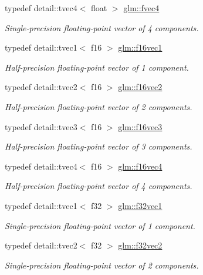 \begin{DoxyCompactItemize}
typedef detail\-::tvec4$<$ float $>$ \hyperlink{group__gtc__type__precision_ga5130b151317f24b13f1d0aa999f5fa36}{glm\-::fvec4}
\begin{DoxyCompactList}\small\item\em Single-\/precision floating-\/point vector of 4 components. \end{DoxyCompactList}\item 
typedef detail\-::tvec1$<$ f16 $>$ \hyperlink{group__gtc__type__precision_ga56f4754172a1f0fb186d95e865106f5a}{glm\-::f16vec1}
\begin{DoxyCompactList}\small\item\em Half-\/precision floating-\/point vector of 1 component. \end{DoxyCompactList}\item 
typedef detail\-::tvec2$<$ f16 $>$ \hyperlink{group__gtc__type__precision_gaba661ca6411ee721e3db5b42ff2755a3}{glm\-::f16vec2}
\begin{DoxyCompactList}\small\item\em Half-\/precision floating-\/point vector of 2 components. \end{DoxyCompactList}\item 
typedef detail\-::tvec3$<$ f16 $>$ \hyperlink{group__gtc__type__precision_gaf59829bded825811f821a3e2aaf6db04}{glm\-::f16vec3}
\begin{DoxyCompactList}\small\item\em Half-\/precision floating-\/point vector of 3 components. \end{DoxyCompactList}\item 
typedef detail\-::tvec4$<$ f16 $>$ \hyperlink{group__gtc__type__precision_gabf914b5cb8fad08b5897f53e7560a2de}{glm\-::f16vec4}
\begin{DoxyCompactList}\small\item\em Half-\/precision floating-\/point vector of 4 components. \end{DoxyCompactList}\item 
typedef detail\-::tvec1$<$ f32 $>$ \hyperlink{group__gtc__type__precision_ga7cc1cb4f45d7274383e6f4ee7fd46f33}{glm\-::f32vec1}
\begin{DoxyCompactList}\small\item\em Single-\/precision floating-\/point vector of 1 component. \end{DoxyCompactList}\item 
typedef detail\-::tvec2$<$ f32 $>$ \hyperlink{group__gtc__type__precision_ga6262c3e58cb4a96545b9ec56f141fa1a}{glm\-::f32vec2}
\begin{DoxyCompactList}\small\item\em Single-\/precision floating-\/point vector of 2 components. \end{DoxyCompactList}\item 

\end{DoxyCompactItemize}
